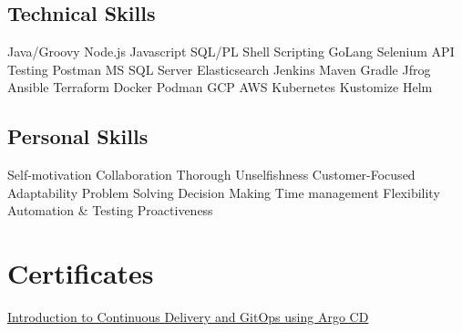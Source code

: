 \documentclass[]{resume-dark}
\begin{document}
\begin{minipage}[t]{0.33\textwidth}
\subsection{Technical Skills}
\textbullet{}Java/Groovy
\textbullet{}Node.js
\textbullet{}Javascript
\textbullet{}SQL/PL
\textbullet{}Shell Scripting
\textbullet{}GoLang
\textbullet{}Selenium
\textbullet{}API Testing
\textbullet{}Postman
\textbullet{}MS SQL Server
\textbullet{}Elasticsearch
\textbullet{}Jenkins
\textbullet{}Maven
\textbullet{}Gradle
\textbullet{}Jfrog
\textbullet{}Ansible
\textbullet{}Terraform
\textbullet{}Docker
\textbullet{}Podman
\textbullet{}GCP
\textbullet{}AWS
\textbullet{}Kubernetes
\textbullet{}Kustomize
\textbullet{}Helm
\sectionsep
\subsection{Personal Skills}
\textbullet{}Self-motivation
\textbullet{}Collaboration
\textbullet{}Thorough
\textbullet{}Unselfishness
\textbullet{}Customer-Focused
\textbullet{}Adaptability
\textbullet{}Problem Solving
\textbullet{}Decision Making
\textbullet{}Time management
\textbullet{}Flexibility
\textbullet{}Automation \& Testing
\textbullet{}Proactiveness
\sectionsep


\section{Certificates}
\textbullet{} \href{https://www.credential.net/8b88c3fc-9afd-4848-8e1b-8080624c0163}{Introduction to Continuous Delivery and GitOps using Argo CD}
\sectionsep

%
%

\end{minipage} 
\hfill
\end{document}
